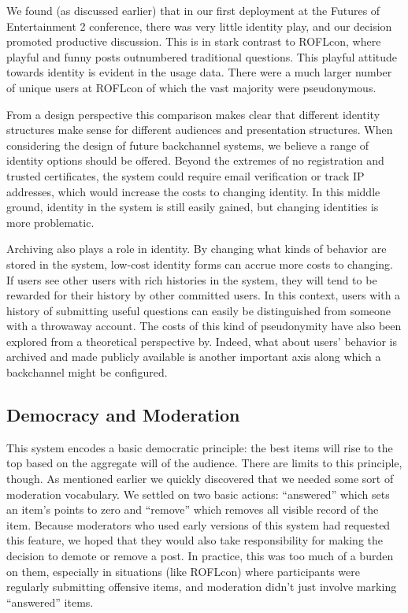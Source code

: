 We found (as discussed earlier) that in our first deployment at the Futures of Entertainment 2 conference, there was very little identity play, and our decision promoted productive discussion. This is in stark contrast to ROFLcon, where playful and funny posts outnumbered traditional questions. This playful attitude towards identity is evident in the usage data. There were a much larger number of unique users at ROFLcon of which the vast majority were pseudonymous.

From a design perspective this comparison makes clear that different identity structures make sense for different audiences and presentation structures. When considering the design of future backchannel systems, we believe a range of identity options should be offered. Beyond the extremes of no registration and trusted certificates, the system could require email verification or track IP addresses, which would increase the costs to changing identity. In this middle ground, identity in the system is still easily gained, but changing identities is more problematic.

Archiving also plays a role in identity. By changing what kinds of behavior are stored in the system, low-cost identity forms can accrue more costs to changing. If users see other users with rich histories in the system, they will tend to be rewarded for their history by other committed users. \citep{Resnick:2002hf} In this context, users with a history of submitting useful questions can easily be distinguished from someone with a throwaway account. The costs of this kind of pseudonymity have also been explored from a theoretical perspective by\citep{Friedman:2001ti}. Indeed, what about users' behavior is archived and made publicly available is another important axis along which a backchannel might be configured.

\subsection{Democracy and Moderation}
This system encodes a basic democratic principle: the best items will rise to the top based on the aggregate will of the audience. There are limits to this principle, though. As mentioned earlier we quickly discovered that we needed some sort of moderation vocabulary. We settled on two basic actions: ``answered'' which sets an item's points to zero and ``remove'' which removes all visible record of the item. Because moderators who used early versions of this system had requested this feature, we hoped that they would also take responsibility for making the decision to demote or remove a post. In practice, this was too much of a burden on them, especially in situations (like ROFLcon) where participants were regularly submitting offensive items, and moderation didn't just involve marking ``answered'' items. 

